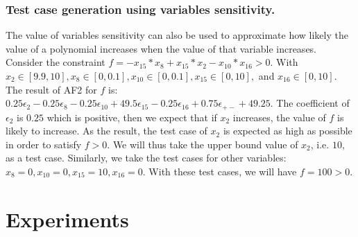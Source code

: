 \documentclass[runningheads,a4paper,oribibl]{llncs}
\newcommand{\suppress}[1]{} %
\begin{document}
\subsubsection*{Test case generation using variables sensitivity.}
\sloppy
The value of variables sensitivity can also be used to approximate how likely the value of a polynomial increases when the value of that variable increases. Consider the constraint $f = -x_{15}*x_8+x_{15}*x_2-x_{10}*x_{16}>0$. With ${x_2 \in [9.9, 10]}, {x_8 \in [0, 0.1]}, {x_{10} \in [0, 0.1]}, {x_{15} \in [0, 10]},$ and $ x_{16} \in [0, 10]$. The result of AF2 for $f$ is: $0.25 \epsilon_2 - 0.25 \epsilon_8 - 0.25 \epsilon_{10} + 49.5\epsilon_{15} - 0.25\epsilon_{16} + 0.75\epsilon_{+-} + 49.25$. The coefficient of $\epsilon_2$ is $0.25$ which is positive, then we expect that if $x_2$ increases, the value of $f$ is likely to increase.  As the result, the test case of $x_2$ is expected as high as possible in order to satisfy $f>0$. We will thus take the upper bound value of $x_2$, i.e. $10$, as a test case. Similarly, we take the test cases for other variables: $x_8=0, x_{10}=0, x_{15}=10, x_{16}=0$. With these test cases, we will have $f=100 > 0$.

\suppress{
I. Selecting API for testing:
  (1) Difficulty first by SAT-likelihood.   
  (2) Easy first by SAT-likelihood
  (10) Random.,
II. Selecting Variable:
  (8) With sensitivity
  (9) Without sensitivity - Random: 
III. Selecting box:
  (3) SAT-directed using IA-Testing.
  (4) UNSAT-directed using IA-Testing.
  (5) SAT-directed using SAT-likelihood
  (6) UNSAT-directed using SAT-likelihood
  (7) Random
}

\section{Experiments} \label{sec:experiment}
\end{document}
